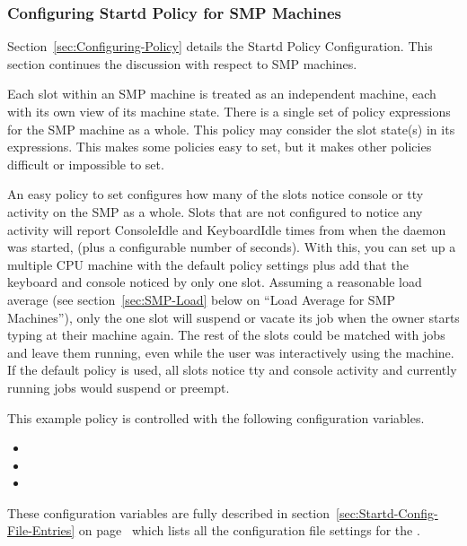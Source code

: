 \subsubsection{\label{sec:Config-SMP-Policy}
Configuring Startd Policy for SMP Machines}

Section~\ref{sec:Configuring-Policy} details the Startd
Policy Configuration.
This section continues the discussion with respect to SMP machines.

Each slot within an SMP machine is treated as an
independent machine,
each with its own view of its machine state.
There is a single set of policy expressions for the SMP machine
as a whole.
This policy may consider the slot state(s) in its expressions.
This makes some policies easy to set, but it makes
other policies difficult or impossible to set.

An easy policy to set
configures how many of the slots
notice console or tty activity on the SMP as a whole.
Slots that are not configured to notice any activity will report
ConsoleIdle and KeyboardIdle times from when the
 daemon was started,
(plus a configurable number of seconds).
With this, you can set up a multiple CPU machine with
the default policy
settings plus add that the keyboard and console noticed by only one
slot.
Assuming a reasonable load average (see
section~\ref{sec:SMP-Load} below on ``Load Average for SMP
Machines''), only the one slot will suspend or vacate its job
when the owner starts typing at their machine again.
The rest of the slots could be matched with jobs and leave
them running, even while the user was interactively using the
machine. 
If the default policy is used,
all slots notice
tty and console activity
and
currently running jobs would suspend or preempt.

This example policy is
controlled with the following configuration variables.
\begin{itemize}
\item {}
\item {}
\item {}
\end{itemize}

These configuration variables are fully described in
section~\ref{sec:Startd-Config-File-Entries} on
page~\pageref{sec:Startd-Config-File-Entries} which lists all the
configuration file settings for the .

